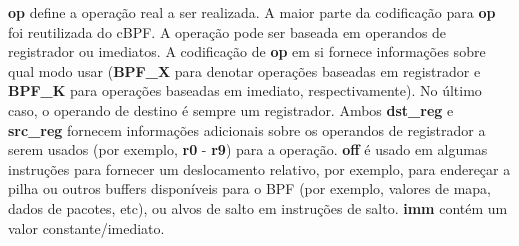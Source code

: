 \documentclass[sigconf]{acmart}
\begin{document}
\textbf{op} define a operação real a ser realizada. A maior parte da codificação para \textbf{op} foi reutilizada do cBPF. A operação pode ser baseada em operandos de registrador ou imediatos. A codificação de \textbf{op} em si fornece informações sobre qual modo usar (\textbf{BPF\_X} para denotar operações baseadas em registrador e \textbf{BPF\_K} para operações baseadas em imediato, respectivamente). No último caso, o operando de destino é sempre um registrador. Ambos \textbf{dst\_reg} e \textbf{src\_reg} fornecem informações adicionais sobre os operandos de registrador a serem usados (por exemplo, \textbf{r0} - \textbf{r9}) para a operação. \textbf{off} é usado em algumas instruções para fornecer um deslocamento relativo, por exemplo, para endereçar a pilha ou outros buffers disponíveis para o BPF (por exemplo, valores de mapa, dados de pacotes, etc), ou alvos de salto em instruções de salto. \textbf{imm} contém um valor constante/imediato.




\end{document}
